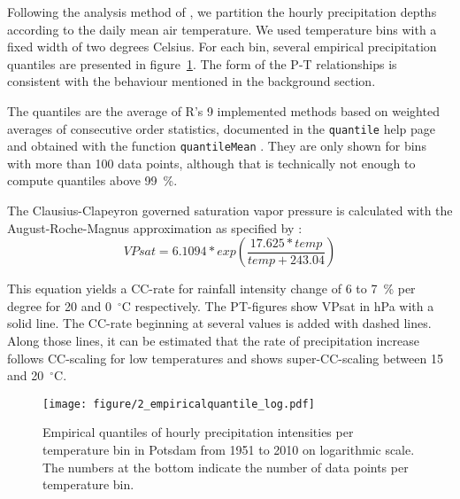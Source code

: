 \documentclass[a4paper]{article}
\begin{document}
\begin{multicols}{2}

Following the analysis method of \citet{lenderink_increase_2008, berg_unexpected_2013}, we partition the hourly precipitation depths according to the daily mean air temperature.
We used temperature bins with a fixed width of two degrees Celsius.
For each bin, several empirical precipitation quantiles are presented in figure~\ref{fig:equant}. The form of the P-T relationships is consistent with the behaviour mentioned in the background section.

The quantiles are the average of R's 9 implemented methods based on weighted averages of consecutive order statistics, documented in the \texttt{quantile} help page \citep{r_core_team_r:_2015-1} and obtained with the function \texttt{quantileMean} \citep{boessenkool_berryfunctions:_2014}.
They are only shown for bins with more than 100 data points, although that is technically not enough to compute quantiles above 99~\%. 

The Clausius-Clapeyron governed saturation vapor pressure is calculated with the August-Roche-Magnus approximation as specified by \citet{hardwick_jones_observed_2010}:
\begin{equation}
VPsat = 6.1094 * exp\left(\frac{17.625*temp}{temp+243.04}\right)
\end{equation}

This equation yields a CC-rate for rainfall intensity change of 6 to 7~\% per degree for 20 and 0~$^{\circ}$C respectively. 
The PT-figures show VPsat in hPa with a solid line.
The CC-rate beginning at several values is added with dashed lines.
Along those lines, it can be estimated that the rate of precipitation increase follows CC-scaling for low temperatures and shows super-CC-scaling between 15 and 20~$^{\circ}$C.

\begin{figure}[H] %
\texttt{[image: figure/2\_empiricalquantile\_log.pdf]}
\caption[Empirical quantiles]{Empirical quantiles of hourly precipitation intensities per temperature bin in Potsdam from 1951 to 2010 on logarithmic scale. The numbers at the bottom indicate the number of data points per temperature bin.}
\label{fig:equant}
\end{figure}

\end{multicols}
\end{document}
